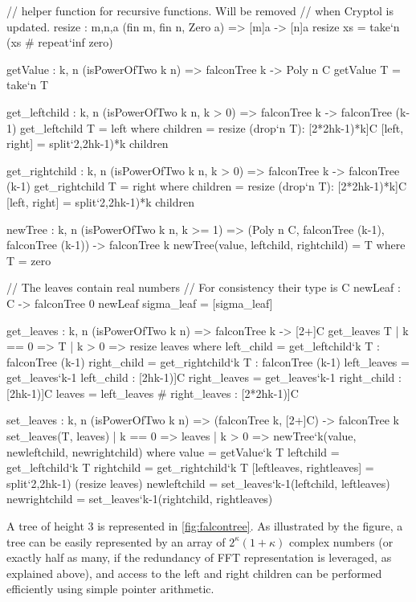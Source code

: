 \begin{code}
  // helper function for recursive functions. Will be removed
  // when Cryptol is updated.
  resize : {m,n,a} (fin m, fin n, Zero a) => [m]a -> [n]a
  resize xs = take`{n} (xs # repeat`{inf} zero)

  getValue : {k, n} (isPowerOfTwo k n) => falconTree k -> Poly n C
  getValue T = take`{n} T

  get_leftchild : {k, n} (isPowerOfTwo k n, k > 0) =>
    falconTree k -> falconTree (k-1)
  get_leftchild T = left where
    children = resize (drop`{n} T): [2*2^^(k-1)*k]C
    [left, right] = split`{2,2^^(k-1)*k} children

  get_rightchild : {k, n} (isPowerOfTwo k n, k > 0) =>
    falconTree k -> falconTree (k-1)
  get_rightchild T = right where
    children = resize (drop`{n} T): [2*2^^(k-1)*k]C
    [left, right] = split`{2,2^^(k-1)*k} children

  newTree : {k, n} (isPowerOfTwo k n, k >= 1) =>
    (Poly n C, falconTree (k-1), falconTree (k-1)) -> falconTree k
  newTree(value, leftchild, rightchild) = T where
    T = zero

  // The leaves contain real numbers
  // For consistency their type is C
  newLeaf : C -> falconTree 0
  newLeaf sigma_leaf = [sigma_leaf]
\end{code}

\begin{code}
  get_leaves : {k, n} (isPowerOfTwo k n) =>
    falconTree k -> [2^^k]C
  get_leaves T
    | k == 0 => T
    | k >  0 => resize leaves where
        left_child = get_leftchild`{k} T : falconTree (k-1)
        right_child = get_rightchild`{k} T : falconTree (k-1)
        left_leaves  = get_leaves`{k-1} left_child : [2^^(k-1)]C
        right_leaves  = get_leaves`{k-1} right_child : [2^^(k-1)]C
        leaves = left_leaves # right_leaves : [2*2^^(k-1)]C

  set_leaves : {k, n} (isPowerOfTwo k n) =>
    (falconTree k, [2^^k]C) -> falconTree k
  set_leaves(T, leaves)
    | k == 0 => leaves
    | k >  0 => newTree`{k}(value, newleftchild, newrightchild) where
        value = getValue`{k} T
        leftchild = get_leftchild`{k} T
        rightchild = get_rightchild`{k} T
        [leftleaves, rightleaves] = split`{2,2^^(k-1)} (resize leaves)
        newleftchild = set_leaves`{k-1}(leftchild, leftleaves)
        newrightchild = set_leaves`{k-1}(rightchild, rightleaves)
\end{code}

 A \falcon tree of height $3$ is represented in \cref{fig:falcontree}. As illustrated by the figure, a \falcon tree can be easily represented by an array of $2^\kappa (1 + \kappa)$ complex numbers (or exactly half as many, if the redundancy of FFT representation is leveraged, as explained above), and access to the left and right children can be performed efficiently using simple pointer arithmetic.

